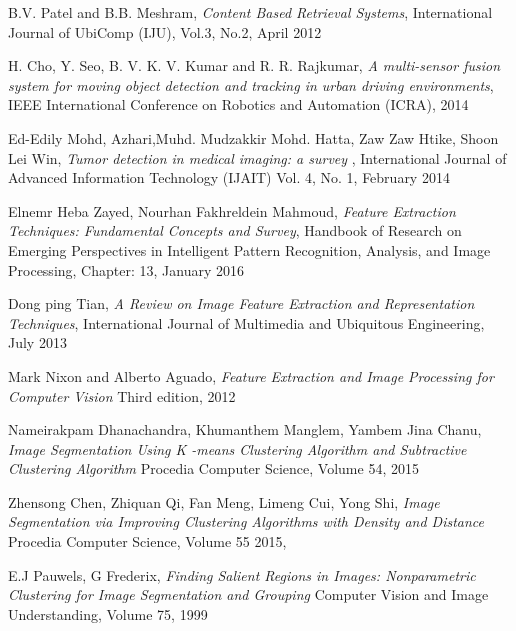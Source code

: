 \documentclass{usiinftr}
\begin{document}
\newpage
\begin{thebibliography}{1}
	
	
	B.V. Patel and B.B. Meshram,
	\textit{Content Based Retrieval Systems},
	International Journal of UbiComp (IJU), Vol.3, No.2, 
	April 2012
	
	H. Cho, Y. Seo, B. V. K. V. Kumar and R. R. Rajkumar, 
	\textit{A multi-sensor fusion system for moving object detection and tracking in urban driving environments}, 
	IEEE International Conference on Robotics and Automation (ICRA), 
	2014
	
	Ed-Edily Mohd,  Azhari,Muhd. Mudzakkir Mohd. Hatta, Zaw Zaw Htike,  Shoon Lei Win, 
	\textit{Tumor detection in medical imaging: a survey }, 
	International Journal of Advanced Information Technology (IJAIT) Vol. 4, No. 1, 
	February 2014
	
		Elnemr Heba Zayed, Nourhan Fakhreldein Mahmoud, 
		\textit{Feature Extraction Techniques: Fundamental Concepts and Survey},
		Handbook of Research on Emerging Perspectives in Intelligent Pattern Recognition, Analysis, and Image Processing, Chapter: 13,
		January 2016
		
		Dong ping  Tian, 
		\textit{A Review on Image Feature Extraction and Representation Techniques},
		International Journal of Multimedia and Ubiquitous Engineering,
		July 2013
		
		Mark Nixon and Alberto Aguado, 
		\textit{Feature Extraction and Image Processing for Computer Vision} Third edition,
		2012
		
		Nameirakpam Dhanachandra, Khumanthem Manglem, Yambem Jina Chanu,  
		\textit{Image Segmentation Using K -means Clustering Algorithm and Subtractive Clustering Algorithm} 
		Procedia Computer Science, Volume 54,
		2015
		
		Zhensong Chen, Zhiquan Qi, Fan Meng, Limeng Cui, Yong Shi,
		\textit{Image Segmentation via Improving Clustering Algorithms with Density and Distance} 
		Procedia Computer Science,
Volume 55
		2015,
		
		E.J Pauwels, G Frederix,
		\textit{Finding Salient Regions in Images: Nonparametric Clustering for Image Segmentation and Grouping} 
		Computer Vision and Image Understanding, Volume 75,
		1999
	


\end{thebibliography}
\end{document}
